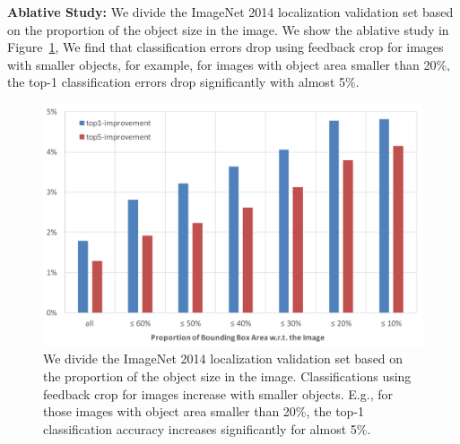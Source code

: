 \textbf{Ablative Study:} We divide the ImageNet 2014 localization validation set based on the proportion of the object size in the image. We show the ablative study in Figure~\ref{fig:reclassification_delta}, We find that classification errors drop using feedback crop for images with smaller objects, for example, for images with object area smaller than 20\%, the top-1 classification errors drop significantly with almost 5\%.

\setlength{\tabcolsep}{2pt}
\begin{figure}[htb]
\begin{center}
\includegraphics[width=0.85\columnwidth]{figs/re-classification/delta}
\caption{We divide the ImageNet 2014 localization validation set based on the proportion of the object size in the image. Classifications using feedback crop for images increase with smaller objects. E.g., for those images with object area smaller than 20\%, the top-1 classification accuracy increases significantly for almost 5\%.}
\label{fig:reclassification_delta}
\end{center}
\end{figure}
